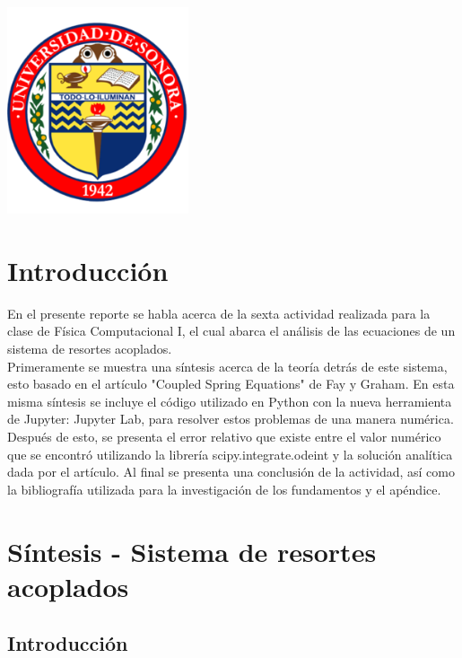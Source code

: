 \documentclass[12pt]{article}
\begin{document}
\begin{titlepage}
\includegraphics[width=0.4\textwidth]{logo.png}\\
 

\vfill %

\end{titlepage}

\section{Introducción}
En el presente reporte se habla acerca de la sexta actividad realizada para la clase de Física Computacional I, el cual abarca el análisis de las ecuaciones de un sistema de resortes acoplados. \\

Primeramente se muestra una síntesis acerca de la teoría detrás de este sistema, esto basado en el artículo "Coupled Spring Equations" de Fay y Graham. En esta misma síntesis se incluye el código utilizado en Python con la nueva herramienta de Jupyter: Jupyter Lab, para resolver estos problemas de una manera numérica. Después de esto, se presenta el error relativo que existe entre el valor numérico que se encontró utilizando la librería scipy.integrate.odeint y la solución analítica dada por el artículo.    Al final se presenta una conclusión de la actividad, así como la bibliografía utilizada para la investigación de los fundamentos y el apéndice. 

\section{Síntesis - Sistema de resortes acoplados}

\subsection{Introducción}
\end{document}
